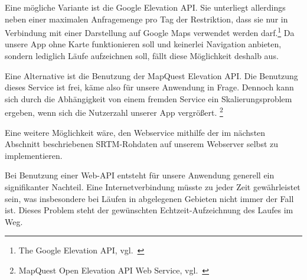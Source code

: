 Eine mögliche Variante ist die Google Elevation API. Sie unterliegt allerdings neben einer maximalen Anfragemenge pro Tag der Restriktion, dass sie nur in Verbindung mit einer Darstellung auf Google Maps verwendet werden darf.\footnote{The Google Elevation API, vgl.~\cite{googleelevation}}  Da unsere App ohne Karte funktionieren soll und keinerlei Navigation anbieten, sondern lediglich Läufe aufzeichnen soll, fällt diese Möglichkeit deshalb aus.

Eine Alternative ist die Benutzung der MapQuest Elevation API. Die Benutzung dieses Service ist frei, käme also für unsere Anwendung in Frage. Dennoch kann sich durch die Abhängigkeit von einem fremden Service ein Skalierungsproblem ergeben, wenn sich die Nutzerzahl unserer App vergrößert. \footnote{MapQuest Open Elevation API Web Service, vgl.~\cite{mapquest}}

Eine weitere Möglichkeit wäre, den Webservice mithilfe der im nächsten Abschnitt beschriebenen SRTM-Rohdaten auf unserem Webserver selbst zu implementieren.

Bei Benutzung einer Web-API entsteht für unsere Anwendung generell ein signifikanter Nachteil. Eine Internetverbindung müsste zu jeder Zeit gewährleistet sein, was insbesondere bei Läufen in abgelegenen Gebieten nicht immer der Fall ist. Dieses Problem steht der gewünschten Echtzeit-Aufzeichnung des Laufes im Weg.
